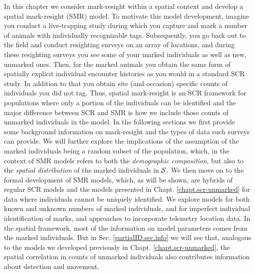 In this chapter we consider mark-resight within
a spatial context and
develop a spatial mark-resight (SMR) model. To motivate this model
development, imagine you conduct a live-trapping study during which
you capture and mark a number of animals with individually
recognizable tags. Subsequently, you go back out to the field and
conduct resighting surveys on an array of locations, and during these
resighting surveys you see some of your marked individuals as well as
new, unmarked ones. Then, for the marked animals you obtain the same
form of spatially explicit individual encounter histories as you would
in a standard SCR study. In addition to that you obtain site (and occasion)
specific counts of individuals you did not tag. Thus, spatial
mark-resight is an SCR framework for populations where only a portion of
the individuals can be identified and the major difference between SCR
and SMR is how we include those counts of unmarked individuals in the
model. In the following sections we first provide some background
information on mark-resight and the types of data such surveys can
provide. We will further explore the implications of the assumption of
the marked individuals being a random subset of the population, which,
in the context of SMR models refers to both the \emph{demographic
  composition}, but also to the \emph{spatial distribution} of the
marked individuals in ${\cal S}$.
We then move on to the formal development of SMR models, which, as
will be shown, are hybrids of regular SCR models and the models
presented in Chapt. \ref{chapt.scr-unmarked} for data where
individuals cannot be uniquely identified. We explore models for both
known and unknown numbers of marked individuals, and for imperfect
individual identification of marks, and approaches to incorporate
telemetry location data. In the spatial framework, most of the
information on model parameters comes from the marked individuals. But
in Sec. \ref{partialID.sec.info} we will see that, analogous to the
models we developed previously in Chapt. \ref{chapt.scr-unmarked}, the
spatial correlation in counts of unmarked individuals also contributes
information about detection and movement.

